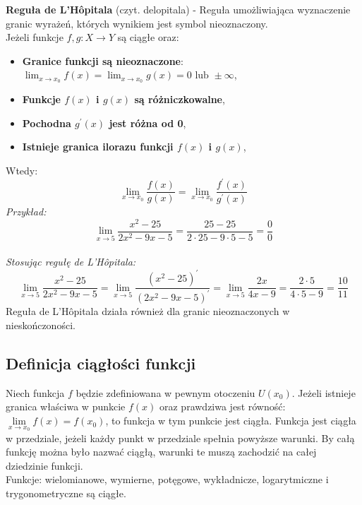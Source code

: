 \documentclass[14pt,a4paper]{extarticle}
\begin{document}
\noindent\textbf{Reguła de L'Hôpitala} (czyt. delopitala) - Reguła umożliwiająca wyznaczenie granic wyrażeń,
których wynikiem jest symbol nieoznaczony.\\
Jeżeli funkcje $f,g:X \rightarrow Y$ są ciągłe oraz:
\begin{itemize}
   \item \textbf{Granice funkcji są nieoznaczone}: $\displaystyle \lim_{x\to x_{0}}f(x) = \lim_{x\to x_{0}}g(x) = 0 \text{ lub } \pm\infty$,
   \item \textbf{Funkcje $f(x)$ i $g(x)$ są różniczkowalne},
   \item \textbf{Pochodna $g^{\prime}(x)$ jest różna od 0},
   \item \textbf{Istnieje granica ilorazu funkcji $f(x)$ i $g(x)$},
\end{itemize}
Wtedy:
$$\lim_{x \to x_{0}}\dfrac{f(x)}{g(x)} = \lim_{x \to x_{0}}\dfrac{f^{\prime}(x)}{g^{\prime}(x)}$$\hfill\break
\noindent\textit{Przykład:}
$$\lim_{x\to 5}\frac{x^{2}-25}{2x^{2}-9x-5} = \frac{25-25}{2\cdot 25 - 9 \cdot 5 -5} = \frac{0}{0}$$
\\\noindent\textit{Stosując regułę de L'Hôpitala:}
$$\lim_{x\to 5}\frac{x^{2}-25}{2x^{2}-9x-5} = \lim_{x\to 5}\frac{(x^{2}-25)^{\prime}}{(2x^{2}-9x-5)^{\prime}} = \lim_{x\to 5}\frac{2x}{4x-9} = \frac{2\cdot 5}{4\cdot 5 - 9} = \frac{10}{11}$$
Reguła de L'Hôpitala działa również dla granic nieoznaczonych w nieskończoności.

\subsection{Definicja ciągłości funkcji}
Niech funkcja $f$ będzie zdefiniowana w pewnym otoczeniu $U(x_0)$. Jeżeli istnieje granica właściwa
w punkcie $f(x)$ oraz prawdziwa jest równość: $\lim\limits_{x \to x_{0}}f(x) = f(x_{0})$, to
funkcja w tym punkcie jest ciągła. Funkcja jest ciągła w przedziale, jeżeli każdy punkt w przedziale
spełnia powyższe warunki. By całą funkcję można było nazwać ciągłą, warunki te muszą zachodzić na 
całej dziedzinie funkcji.\\
Funkcje: wielomianowe, wymierne, potęgowe, wykładnicze, logarytmiczne i trygonometryczne są ciągłe.
\end{document}
